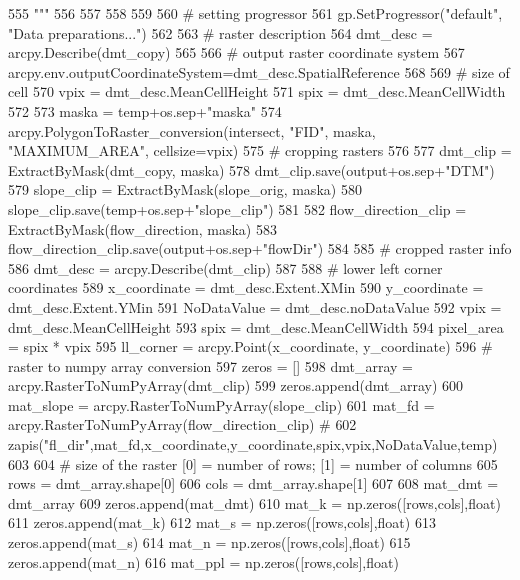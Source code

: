 \begin{DoxyCode}
{}
555 \textcolor{stringliteral}{  """}
556 
557 
558 
559 
560   \textcolor{comment}{# setting progressor
}
561   gp.SetProgressor(\textcolor{stringliteral}{"default"}, \textcolor{stringliteral}{"Data preparations..."})
562 
563   \textcolor{comment}{# raster description
}
564   dmt\_desc = arcpy.Describe(dmt\_copy)
565 
566   \textcolor{comment}{# output raster coordinate system
}
567   arcpy.env.outputCoordinateSystem=dmt\_desc.SpatialReference
568 
569   \textcolor{comment}{# size of cell
}
570   vpix = dmt\_desc.MeanCellHeight
571   spix = dmt\_desc.MeanCellWidth
572 
573   maska = temp+os.sep+\textcolor{stringliteral}{"maska"}
574   arcpy.PolygonToRaster\_conversion(intersect, \textcolor{stringliteral}{"FID"}, maska, \textcolor{stringliteral}{"MAXIMUM\_AREA"}, cellsize=vpix)
575   \textcolor{comment}{# cropping rasters
}
576 
577   dmt\_clip = ExtractByMask(dmt\_copy, maska)
578   dmt\_clip.save(output+os.sep+\textcolor{stringliteral}{"DTM"})
579   slope\_clip = ExtractByMask(slope\_orig, maska)
580   slope\_clip.save(temp+os.sep+\textcolor{stringliteral}{"slope\_clip"})
581 
582   flow\_direction\_clip = ExtractByMask(flow\_direction, maska)
583   flow\_direction\_clip.save(output+os.sep+\textcolor{stringliteral}{"flowDir"})
584 
585   \textcolor{comment}{# cropped raster info
}
586   dmt\_desc = arcpy.Describe(dmt\_clip)
587 
588   \textcolor{comment}{# lower left corner coordinates
}
589   x\_coordinate = dmt\_desc.Extent.XMin
590   y\_coordinate = dmt\_desc.Extent.YMin
591   NoDataValue = dmt\_desc.noDataValue
592   vpix = dmt\_desc.MeanCellHeight
593   spix = dmt\_desc.MeanCellWidth
594   pixel\_area = spix * vpix
595   ll\_corner = arcpy.Point(x\_coordinate, y\_coordinate)
596   \textcolor{comment}{# raster to numpy array conversion
}
597   zeros = []
598   dmt\_array = arcpy.RasterToNumPyArray(dmt\_clip)
599   zeros.append(dmt\_array)
600   mat\_slope = arcpy.RasterToNumPyArray(slope\_clip)
601   mat\_fd = arcpy.RasterToNumPyArray(flow\_direction\_clip) \textcolor{comment}{#
}
602   zapis(\textcolor{stringliteral}{"fl\_dir"},mat\_fd,x\_coordinate,y\_coordinate,spix,vpix,NoDataValue,temp)
603 
604   \textcolor{comment}{# size of the raster [0] = number of rows; [1] = number of columns
}
605   rows = dmt\_array.shape[0]
606   cols = dmt\_array.shape[1]
607 
608   mat\_dmt = dmt\_array
609   zeros.append(mat\_dmt)
610   mat\_k = np.zeros([rows,cols],float)
611   zeros.append(mat\_k)
612   mat\_s = np.zeros([rows,cols],float)
613   zeros.append(mat\_s)
614   mat\_n = np.zeros([rows,cols],float)
615   zeros.append(mat\_n)
616   mat\_ppl = np.zeros([rows,cols],float)

\end{DoxyCode}
